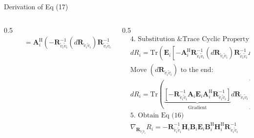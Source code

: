 \documentclass[aspectratio=169, 10pt]{beamer}
\begin{document}
\begin{frame}{Derivation of Eq (17)}
\begin{columns}
\begin{column}{0.5\paperwidth}
\begin{align*}
                 & \phantom{d\mathbf{K}_i} = \mathbf{A}_i^\mathrm{H} \left( - \mathbf{R}_{\tilde{v}_i\tilde{v}_i}^{-1} (d\mathbf{R}_{\tilde{v}_i\tilde{v}_i}) \mathbf{R}_{\tilde{v}_i\tilde{v}_i}^{-1} \right) \mathbf{A}_i \\[1.2em]
            \end{align*}
        \end{column}
        \begin{column}{0.5\paperwidth}
            \begin{align*}
                 & \text{4. Substitution \& Trace Cyclic Property}                                                                                                                                                                                                                \\
                 & d R_i = \mathrm{Tr}\left( \mathbf{E}_i \left[ - \mathbf{A}_i^\mathrm{H} \mathbf{R}_{\tilde{v}_i\tilde{v}_i}^{-1} (d\mathbf{R}_{\tilde{v}_i\tilde{v}_i}) \mathbf{R}_{\tilde{v}_i\tilde{v}_i}^{-1} \mathbf{A}_i \right] \right)                                  \\
                 & \textrm{Move } (d\mathbf{R}_{\tilde{v}_i\tilde{v}_i}) \textrm{ to the end:}                                                                                                                                                                                    \\
                 & d R_i = \mathrm{Tr}\left( \underbrace{ \left[ - \mathbf{R}_{\tilde{v}_i\tilde{v}_i}^{-1} \mathbf{A}_i \mathbf{E}_i \mathbf{A}_i^\mathrm{H} \mathbf{R}_{\tilde{v}_i\tilde{v}_i}^{-1} \right] }_{\mathrm{Gradient}} d\mathbf{R}_{\tilde{v}_i\tilde{v}_i} \right) \\[1.2em]
                 & \text{5. Obtain Eq (16)}                                                                                                                                                                                                                                       \\
                 & \nabla_{\mathbf{R}_{\tilde{v}_i\tilde{v}_i}} R_i = - \mathbf{R}_{\tilde{v}_i\tilde{v}_i}^{-1} \mathbf{H}_i \mathbf{B}_i \mathbf{E}_i \mathbf{B}_i^\mathrm{H} \mathbf{H}_i^\mathrm{H} \mathbf{R}_{\tilde{v}_i\tilde{v}_i}^{-1}
            \end{align*}
        \end{column}
    \end{columns}
    \vspace{-7ex}
\end{frame}
\end{document}
